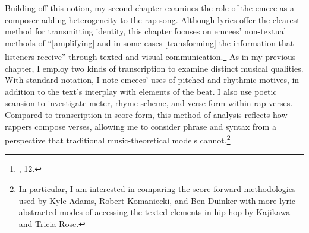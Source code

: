 Building off this notion, my second chapter examines the role of the emcee as a composer adding heterogeneity to the rap song. Although lyrics offer the clearest method for transmitting identity, this chapter focuses on emcees' non-textual methods of ``[amplifying] and in some cases [transforming] the information that listeners receive'' through texted and visual communication.\footnote{\cite{lorenkajikawaSoundingRaceRap2015}, 12.} As in my previous chapter, I employ two kinds of transcription to examine distinct musical qualities. With standard notation, I note emcees' uses of pitched and rhythmic motives, in addition to the text's interplay with elements of the beat. I also use poetic scansion to investigate meter, rhyme scheme, and verse form within rap verses. Compared to transcription in score form, this method of analysis reflects how rappers compose verses, allowing me to consider phrase and syntax from a perspective that traditional music-theoretical models cannot.\footnote{In particular, I am interested in comparing the score-forward methodologies used by Kyle Adams, Robert Komaniecki, and Ben Duinker with more lyric-abstracted modes of accessing the texted elements in hip-hop by Kajikawa and Tricia Rose.}